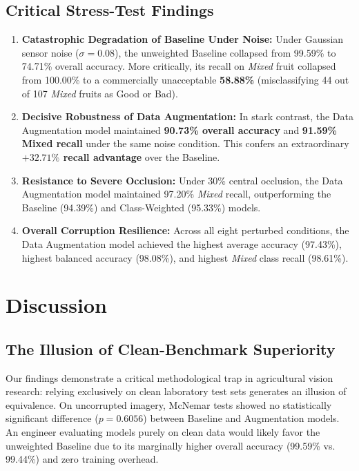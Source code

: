 \documentclass[conference]{IEEEtran}
\begin{document}
\subsection{Critical Stress-Test Findings}
\begin{enumerate}
    \item \textbf{Catastrophic Degradation of Baseline Under Noise:} Under Gaussian sensor noise ($\sigma = 0.08$), the unweighted Baseline collapsed from 99.59\% to 74.71\% overall accuracy. More critically, its recall on \textit{Mixed} fruit collapsed from 100.00\% to a commercially unacceptable \textbf{58.88\%} (misclassifying 44 out of 107 \textit{Mixed} fruits as Good or Bad).
    \item \textbf{Decisive Robustness of Data Augmentation:} In stark contrast, the Data Augmentation model maintained \textbf{90.73\% overall accuracy} and \textbf{91.59\% Mixed recall} under the same noise condition. This confers an extraordinary \textbf{$+32.71\%$ recall advantage} over the Baseline.
    \item \textbf{Resistance to Severe Occlusion:} Under 30\% central occlusion, the Data Augmentation model maintained 97.20\% \textit{Mixed} recall, outperforming the Baseline (94.39\%) and Class-Weighted (95.33\%) models.
    \item \textbf{Overall Corruption Resilience:} Across all eight perturbed conditions, the Data Augmentation model achieved the highest average accuracy (97.43\%), highest balanced accuracy (98.08\%), and highest \textit{Mixed} class recall (98.61\%).
\end{enumerate}

\section{Discussion}
\subsection{The Illusion of Clean-Benchmark Superiority}
Our findings demonstrate a critical methodological trap in agricultural vision research: relying exclusively on clean laboratory test sets generates an illusion of equivalence. On uncorrupted imagery, McNemar tests showed no statistically significant difference ($p=0.6056$) between Baseline and Augmentation models. An engineer evaluating models purely on clean data would likely favor the unweighted Baseline due to its marginally higher overall accuracy (99.59\% vs. 99.44\%) and zero training overhead.
\end{document}

